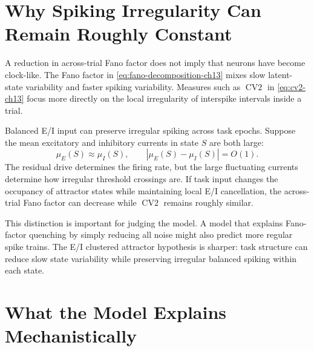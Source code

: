 \section{Why Spiking Irregularity Can Remain Roughly Constant}
\label{sec:why-spiking-irregularity-can-remain-constant}

A reduction in across-trial Fano factor does not imply that neurons have become clock-like. The Fano factor in \eqref{eq:fano-decomposition-ch13} mixes slow latent-state variability and faster spiking variability. Measures such as $\operatorname{CV2}$ in \eqref{eq:cv2-ch13} focus more directly on the local irregularity of interspike intervals inside a trial.

Balanced E/I input can preserve irregular spiking across task epochs. Suppose the mean excitatory and inhibitory currents in state $S$ are both large:
%
\begin{equation}
  \mu_E(S)\approx \mu_I(S),
  \qquad
  |\mu_E(S)-\mu_I(S)| = O(1).
  \label{eq:balanced-current-scaling-ch13}
\end{equation}
%
The residual drive determines the firing rate, but the large fluctuating currents determine how irregular threshold crossings are. If task input changes the occupancy of attractor states while maintaining local E/I cancellation, the across-trial Fano factor can decrease while $\operatorname{CV2}$ remains roughly similar.

This distinction is important for judging the model. A model that explains Fano-factor quenching by simply reducing all noise might also predict more regular spike trains. The E/I clustered attractor hypothesis is sharper: task structure can reduce slow state variability while preserving irregular balanced spiking within each state.

\section{What the Model Explains Mechanistically}
\label{sec:what-rostami-model-explains-mechanistically}

